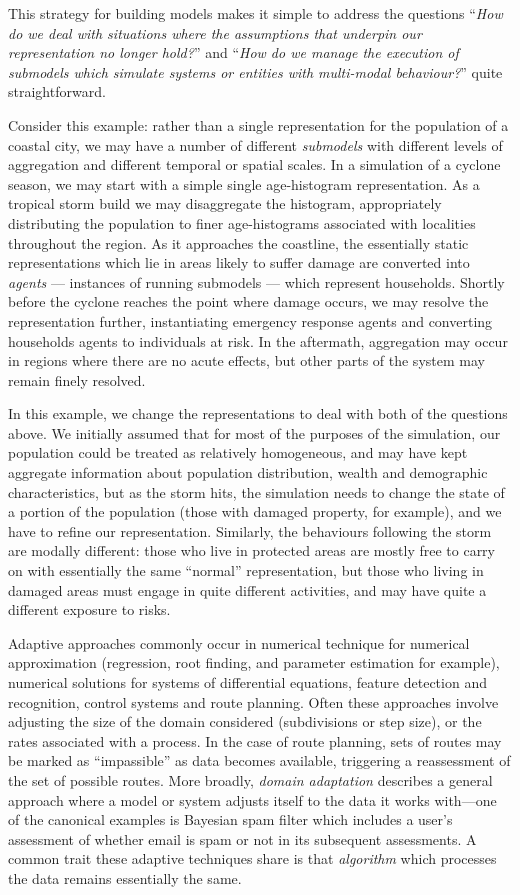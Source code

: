 This strategy for building models makes it simple to address the
questions ``\emph{How do we deal with situations 
where the assumptions that underpin our representation no longer hold?}'' 
and ``\emph{How do we manage the execution of submodels which simulate
systems or entities with multi-modal behaviour?}'' quite straightforward.

Consider this example: rather than a single representation for the
population of a coastal city, we may have a number of
different \emph{submodels} with different levels of aggregation and
different temporal or spatial scales.  In a simulation of a cyclone
season, we may start with a simple single age-histogram representation.
As a tropical storm build we may disaggregate the histogram,
appropriately distributing the population to finer age-histograms
associated with localities throughout the region.  As it approaches
the coastline, the essentially static representations which lie in
areas likely to suffer damage are converted into \emph{agents} ---
instances of running submodels --- which represent households.
Shortly before the cyclone reaches the point where damage occurs, we
may resolve the representation further, instantiating emergency
response agents and converting households agents to individuals at
risk.  In the aftermath, aggregation may occur in regions where there
are no acute effects, but other parts of the system may remain finely
resolved.

In this example, we change the representations to deal with both
of the questions above.  We initially assumed that for most of the
purposes of the simulation, our population could be treated as
relatively homogeneous, and may have kept aggregate information about
population distribution, wealth and demographic characteristics, but
as the storm hits, the simulation needs to change the state of
a portion of the population (those with damaged property, for
example), and we have to refine our representation.  Similarly, the
behaviours following the storm are modally different: those who live
in protected areas are mostly free to carry on with essentially the
same ``normal'' representation, but those who living in damaged areas
must engage in quite different activities, and may have quite a
different exposure to risks.

Adaptive approaches commonly occur in numerical technique for
numerical approximation (regression, root finding, and parameter
estimation for example), numerical solutions for systems of
differential equations, feature detection and recognition, control
systems and route planning.  Often these approaches involve adjusting
the size of the domain considered (subdivisions or step size), or the
rates associated with a process. In the case of route planning, sets
of routes may be marked as ``impassible'' as data becomes available,
triggering a reassessment of the set of possible routes. More
broadly, \emph{domain adaptation} describes a general approach where a
model or system adjusts itself to the data it works with---one of the
canonical examples is Bayesian spam filter which includes a user's
assessment of whether email is spam or not in its subsequent
assessments. A common trait these adaptive techniques share is that
\emph{algorithm} which processes the data remains essentially the same.

